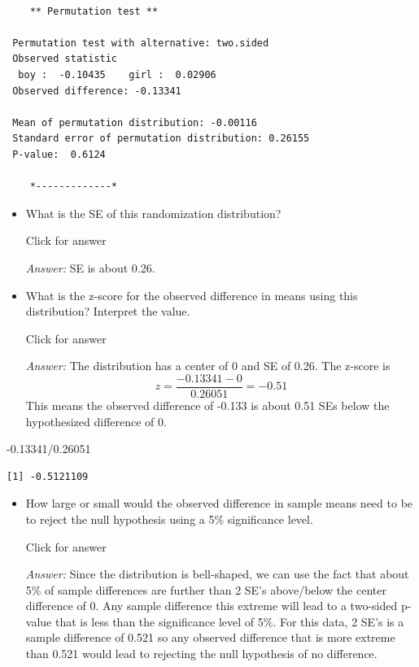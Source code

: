 \documentclass[
]{book}
\newenvironment{Shaded}{\begin{snugshade}}{\end{snugshade}}
\newcommand{\FloatTok}[1]{\textcolor[rgb]{0.00,0.00,0.81}{#1}}
\newcommand{\SpecialCharTok}[1]{\textcolor[rgb]{0.00,0.00,0.00}{#1}}
\providecommand{\tightlist}{%
  \setlength{\itemsep}{0pt}\setlength{\parskip}{0pt}}
\begin{document}
\begin{verbatim}

    ** Permutation test **

 Permutation test with alternative: two.sided 
 Observed statistic
  boy :  -0.10435    girl :  0.02906 
 Observed difference: -0.13341 

 Mean of permutation distribution: -0.00116 
 Standard error of permutation distribution: 0.26155 
 P-value:  0.6124 

    *-------------*
\end{verbatim}

\begin{itemize}
\tightlist
\item
  What is the SE of this randomization distribution?

  Click for answer

  \emph{Answer:} SE is about 0.26.
\end{itemize}

\begin{itemize}
\tightlist
\item
  What is the z-score for the observed difference in means using this distribution? Interpret the value.
  \vspace*{.5in}

  Click for answer

  \emph{Answer:} The distribution has a center of 0 and SE of 0.26. The z-score is
  \[
  z = \dfrac{-0.13341 - 0}{0.26051} = -0.51
  \]
  This means the observed difference of -0.133 is about 0.51 SEs below the hypothesized difference of 0.
\end{itemize}

\begin{Shaded}
\begin{Highlighting}[]
\SpecialCharTok{{-}}\FloatTok{0.13341}\SpecialCharTok{/}\FloatTok{0.26051} 
\end{Highlighting}
\end{Shaded}

\begin{verbatim}
[1] -0.5121109
\end{verbatim}

\begin{itemize}
\tightlist
\item
  How large or small would the observed difference in sample means need to be to reject the null hypothesis using a 5\% significance level.

  Click for answer

  \emph{Answer:} Since the distribution is bell-shaped, we can use the fact that about 5\% of sample differences are further than 2 SE's above/below the center difference of 0. Any sample difference this extreme will lead to a two-sided p-value that is less than the significance level of 5\%. For this data, 2 SE's is a sample difference of 0.521 so any observed difference that is more extreme than 0.521 would lead to rejecting the null hypothesis of no difference.
\end{itemize}
\end{document}
